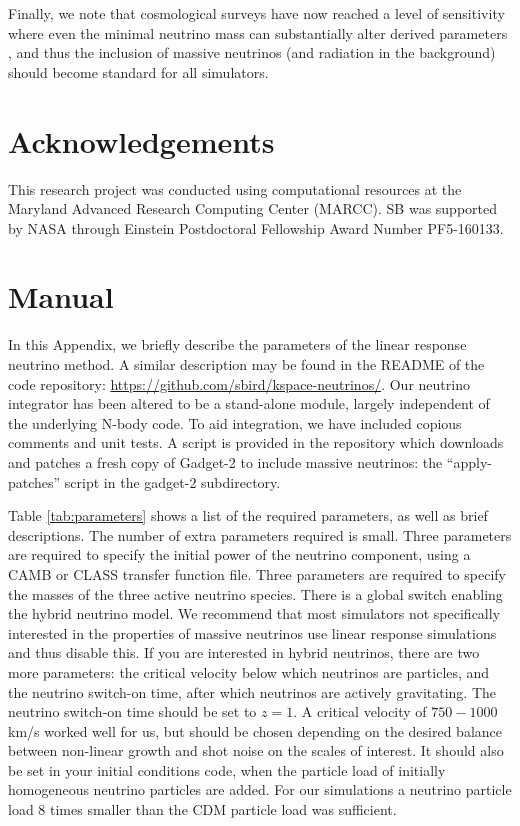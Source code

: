 \documentclass[useAMS, usenatbib]{mnras}
\begin{document}
Finally, we note that cosmological surveys have now reached a level of sensitivity where even the minimal neutrino mass can substantially alter derived parameters \citep{Calabrese_2017}, and thus the inclusion of massive neutrinos (and radiation in the background) should become standard for all simulators.

\section*{Acknowledgements}

This research project was conducted using computational resources 
at the Maryland Advanced Research Computing Center (MARCC). SB was supported by NASA through 
Einstein Postdoctoral Fellowship Award Number PF5-160133.

\appendix

\section{Manual}
\label{sec:manual}

In this Appendix, we briefly describe the parameters of the linear response neutrino method. A similar description may be found in the README of the code repository: \url{https://github.com/sbird/kspace-neutrinos/}. Our neutrino integrator has been altered to be a stand-alone module, largely independent of the underlying N-body code. To aid integration, we have included copious comments and unit tests. A script is provided in the repository which downloads and patches a fresh copy of Gadget-2 to include massive neutrinos: the ``apply-patches'' script in the gadget-2 subdirectory.

Table \ref{tab:parameters} shows a list of the required parameters, as well as brief descriptions. The number of extra parameters required is small. Three parameters are required to specify the initial power of the neutrino component, using a CAMB or CLASS transfer function file. Three parameters are required to specify the masses of the three active neutrino species.
There is a global switch enabling the hybrid neutrino model. We recommend that most simulators not specifically interested in the properties of massive neutrinos use linear response simulations and thus disable this. If you are interested in hybrid neutrinos, there are two more parameters: the critical velocity below which neutrinos are particles, and the neutrino switch-on time, after which neutrinos are actively gravitating. The neutrino switch-on time should be set to $z=1$. A critical velocity of $750-1000$ km/s worked well for us, but should be chosen depending on the desired balance between non-linear growth and shot noise on the scales of interest.
It should also be set in your initial conditions code, when the particle load of initially homogeneous neutrino particles are added.
For our simulations a neutrino particle load $8$ times smaller than the CDM particle load was sufficient.
\end{document}
